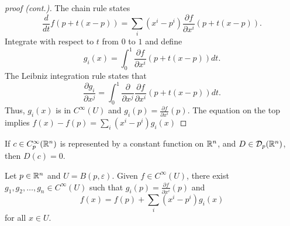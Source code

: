 \begin{frame}
  \begin{proof}[proof (cont.)]
    The chain rule states
    \begin{displaymath}
      \frac{d}{dt} f(p + t(x-p))
      = \sum_i (x^i - p^i) \frac{\partial f}{\partial x^i}(p + t(x - p)).
    \end{displaymath}
    Integrate with respect to $t$ from $0$ to $1$ and define
    \begin{displaymath}
      g_i(x) = \int_0^1 \frac{\partial f}{\partial x^i} (p + t(x - p)) dt.
    \end{displaymath}
    The Leibniz integration rule states that
    \begin{displaymath}
      \frac{\partial g_i}{\partial x^j} =
      \int_0^1 \frac{\partial}{\partial x^j}\frac{\partial f}{\partial x^i} (p + t(x - p)) dt.
    \end{displaymath}
    Thus, $g_i(x)$ is in $C^{\infty}(U)$ and $g_i(p) = \frac{\partial
    f}{\partial x^i}(p)$. The equation on the top implies $f(x) - f(p) = \sum_i
    (x^i - p^i)g_i(x)$
  \end{proof}
\end{frame}

\begin{frame}
  \begin{lemma}
    If $c \in C^{\infty}_p(\mathbb R^n)$ is represented by a constant function on 
    $\mathbb R^n$, and $D \in {\mathcal D}_p(\mathbb R^n)$, then $D(c) = 0$.
  \end{lemma}
  \begin{lemma}
    Let $p \in \mathbb R^n$ and $U = B(p, \varepsilon)$. Given $f \in C^{\infty}(U)$,
    there exist $g_1, g_2, \dots, g_n \in C^{\infty}(U)$ such that 
    $g_i(p) = \frac{\partial f}{\partial x^i}(p)$ and
    \begin{displaymath}
      f(x) = f(p) + \sum_{i} (x^i - p^i) g_i(x)
    \end{displaymath}
    for all $x \in U$.
  \end{lemma}
\end{frame}


